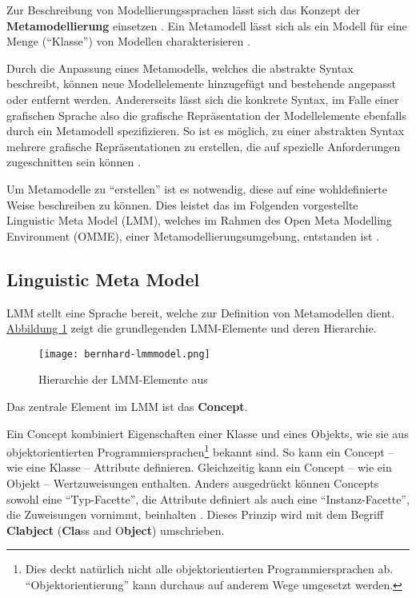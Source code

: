 \documentclass[a4paper,10pt]{sphinxmanual}
\begin{document}
Zur Beschreibung von Modellierungssprachen lässt sich das Konzept der \textbf{Metamodellierung} einsetzen \cite{weisemoller_comparison_2008} \cite{volz_werkzeugunterstutzung_2011}.
Ein Metamodell lässt sich als ein Modell für eine Menge ("`Klasse"') von Modellen charakterisieren \cite{seidewitz_what_2003}.

Durch die Anpassung eines Metamodells, welches die abstrakte Syntax beschreibt, können neue Modellelemente hinzugefügt und bestehende angepasst oder entfernt werden.
Andererseits lässt sich die konkrete Syntax, im Falle einer grafischen Sprache also die grafische Repräsentation der Modellelemente ebenfalls durch ein Metamodell spezifizieren.
So ist es möglich, zu einer abstrakten Syntax mehrere grafische Repräsentationen zu erstellen, die auf spezielle Anforderungen zugeschnitten sein können \cite{jablonski_perspective_2008}.

Um Metamodelle zu "`erstellen"' ist es notwendig, diese auf eine wohldefinierte Weise beschreiben zu können.
Dies leistet das im Folgenden vorgestellte Linguistic Meta Model (LMM), welches im Rahmen des Open Meta Modelling Environment (OMME), einer Metamodellierungsumgebung, entstanden ist \cite{volz_werkzeugunterstutzung_2011}.


\subsection{Linguistic Meta Model}
\label{grundlagen:lmm}\label{grundlagen:linguistic-meta-model}
LMM stellt eine Sprache bereit, welche zur Definition von Metamodellen dient.
\hyperref[grundlagen:lmm-model]{Abbildung  \ref*{grundlagen:lmm-model}} zeigt die grundlegenden LMM-Elemente und deren Hierarchie.
\begin{figure}[htbp]
\centering
\capstart

\texttt{[image: bernhard-lmmmodel.png]}
\caption{Hierarchie der LMM-Elemente aus \cite{volz_werkzeugunterstutzung_2011}}\label{grundlagen:lmm-model}\end{figure}

Das zentrale Element im LMM ist das \textbf{Concept}.

Ein Concept kombiniert Eigenschaften einer Klasse und eines Objekts, wie sie aus objektorientierten Programmiersprachen\footnote{
Dies deckt natürlich nicht alle objektorientierten Programmiersprachen ab. "`Objektorientierung"' kann durchaus auf anderem Wege umgesetzt werden.
} bekannt sind.
So kann ein Concept – wie eine Klasse – Attribute definieren. Gleichzeitig kann ein Concept – wie ein Objekt –  Wertzuweisungen enthalten.
Anders ausgedrückt können Concepts sowohl eine "`Typ-Facette"', die Attribute definiert als auch eine "`Instanz-Facette"', die Zuweisungen vornimmt, beinhalten \cite{atkinson_meta-level_2000}.
Dieses Prinzip wird mit dem Begriff \textbf{Clabject} (\textbf{Cla}ss and O\textbf{bject}) umschrieben.
\end{document}

